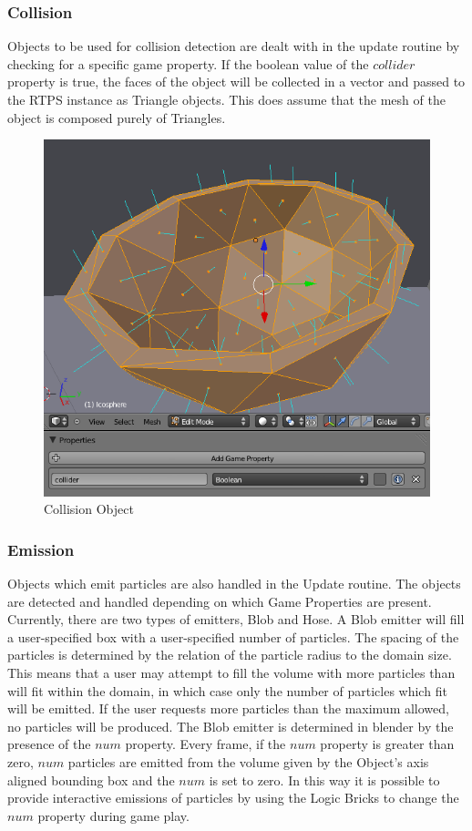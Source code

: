 \subsubsection{Collision}
Objects to be used for collision detection are dealt with in the update routine
by checking for a specific game property. If the boolean value of the
$collider$ property is true, the faces of the object will be collected in a
vector and passed to the RTPS instance as Triangle objects. This does assume
that the mesh of the object is composed purely of Triangles. 
\begin{figure}[!htc]
 		\centering
		\includegraphics[scale=0.6]{figures/collision_ui.png}
        \caption{ Collision Object }
		\label{fig:collision_ui}
\end{figure}


\subsubsection{Emission}
Objects which emit particles are also handled in the Update routine. The
objects are detected and handled depending on which Game Properties are
present. Currently, there are two types of emitters, Blob and Hose. A Blob
emitter will fill a user-specified box with a user-specified number of
particles. The spacing of the particles is determined by the relation of the
particle radius to the domain size. This means that a user may attempt to fill
the volume with more particles than will fit within the domain, in which case
only the number of particles which fit will be emitted. If the user requests 
more particles than the maximum allowed, no particles will be produced.
The Blob emitter is determined in blender by the presence of the $num$
property. Every frame, if the $num$ property is greater than zero, $num$
particles are emitted from the volume given by the Object's axis aligned
bounding box and the $num$ is set to zero. In this way it is possible to
provide interactive emissions of particles by using the Logic Bricks to change
the $num$ property during game play.

